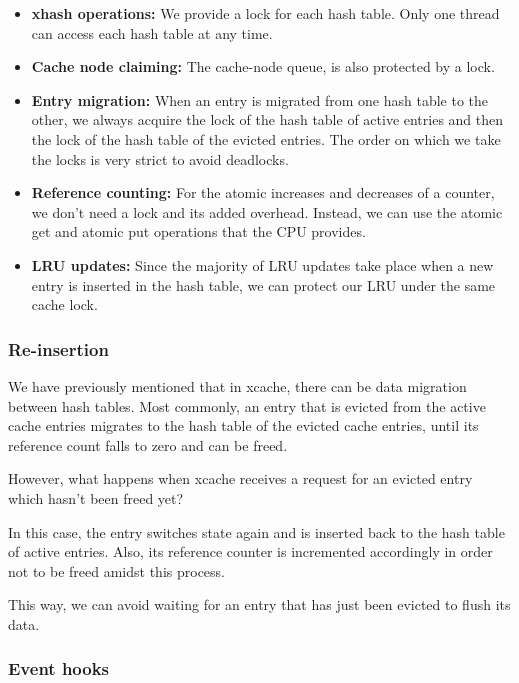 \begin{itemize}
	\item
		\textbf{xhash operations:} We provide a lock for each hash 
		table. Only one thread can access each hash table at any time.
	\item
		\textbf{Cache node claiming:} The cache-node queue, is also 
		protected by a lock.
	\item
		\textbf{Entry migration:} When an entry is migrated from one 
		hash table to the other, we always acquire the lock of the hash 
		table of active entries and then the lock of the hash table of 
		the evicted entries. The order on which we take the locks is 
		very strict to avoid deadlocks.
	\item
		\textbf{Reference counting:} For the atomic increases and 
		decreases of a counter, we don't need a lock and its added 
		overhead. Instead, we can use the atomic get and atomic put 
		operations that the CPU provides.
	\item
		\textbf{LRU updates:} Since the majority of LRU updates take
		place when a new entry is inserted in the hash table, we can 
		protect our LRU under the same cache lock.
\end{itemize}

\subsubsection{Re-insertion}

We have previously mentioned that in xcache, there can be data migration 
between hash tables. Most commonly, an entry that is evicted from the active 
cache entries migrates to the hash table of the evicted cache entries, until 
its reference count falls to zero and can be freed.

However, what happens when xcache receives a request for an evicted entry which 
hasn't been freed yet? 

In this case, the entry switches state again and is inserted back to the hash 
table of active entries. Also, its reference counter is incremented accordingly 
in order not to be freed amidst this process.

This way, we can avoid waiting for an entry that has just been evicted to flush 
its data. 

\subsubsection{Event hooks}\label{sec:xcache-hooks-design}

